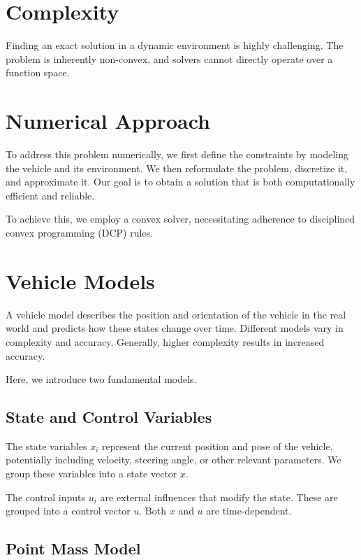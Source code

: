 \section{Complexity}

Finding an exact solution in a dynamic environment is highly challenging.
The problem is inherently non-convex, and solvers cannot directly operate over a function space.

\section{Numerical Approach}

To address this problem numerically, we first define the constraints by modeling the vehicle and its environment.
We then reformulate the problem, discretize it, and approximate it.
Our goal is to obtain a solution that is both computationally efficient and reliable.

To achieve this, we employ a convex solver, necessitating adherence to disciplined convex programming (DCP) rules.

\section{Vehicle Models}

A vehicle model describes the position and orientation of the vehicle in the real world and predicts how these states change over time.
Different models vary in complexity and accuracy.
Generally, higher complexity results in increased accuracy.

Here, we introduce two fundamental models.

\subsection{State and Control Variables}

The state variables $x_i$ represent the current position and pose of the vehicle, potentially including velocity, steering angle, or other relevant
parameters.
We group these variables into a state vector $x$.

The control inputs $u_i$ are external influences that modify the state.
These are grouped into a control vector $u$.
Both $x$ and $u$ are time-dependent.

\subsection{Point Mass Model} \label{section:basic_pm}

